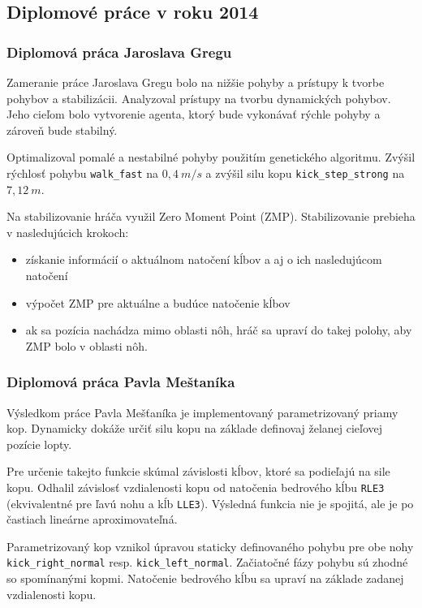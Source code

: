\subsection{Diplomové práce v roku 2014}

\subsubsection{Diplomová práca Jaroslava Gregu}
Zameranie práce Jaroslava Gregu \cite{grega} bolo na nižšie pohyby a prístupy k tvorbe pohybov a stabilizácii. Analyzoval prístupy na tvorbu dynamických pohybov. Jeho cieľom bolo vytvorenie agenta, ktorý bude vykonávať rýchle pohyby a zároveň bude stabilný. 

Optimalizoval pomalé a nestabilné pohyby použitím genetického algoritmu. Zvýšil rýchlosť pohybu \texttt{walk\_fast} na $0,4~m/s$ a zvýšil silu kopu \texttt{kick\_step\_strong} na $7,12~m$.

Na stabilizovanie hráča využil Zero Moment Point (ZMP). Stabilizovanie prebieha v nasledujúcich krokoch:
\begin{itemize}
	\item získanie informácií o aktuálnom natočení kĺbov a aj o ich nasledujúcom natočení
	\item výpočet ZMP pre aktuálne a budúce natočenie kĺbov
	\item ak sa pozícia nachádza mimo oblasti nôh, hráč sa upraví do takej polohy, aby ZMP bolo v oblasti nôh.
\end{itemize}

\subsubsection{Diplomová práca Pavla Meštaníka} \label{sec_mestanik}

Výsledkom práce Pavla Mešťaníka \cite{mestanik} je implementovaný parametrizovaný priamy kop. Dynamicky dokáže určiť silu kopu na základe definovaj želanej cieľovej pozície lopty. 

Pre určenie takejto funkcie skúmal závislosti kĺbov, ktoré sa podieľajú na sile kopu. Odhalil závislosť vzdialenosti kopu od natočenia bedrového kĺbu \texttt{RLE3} (ekvivalentné pre ľavú nohu a kĺb \texttt{LLE3}). Výsledná funkcia nie je spojitá, ale je po častiach lineárne aproximovateľná. 

Parametrizovaný kop vznikol úpravou staticky definovaného pohybu pre obe nohy \texttt{kick\_right\_normal} resp. \texttt{kick\_left\_normal}. Začiatočné fázy pohybu sú zhodné so spomínanými kopmi. Natočenie bedrového kĺbu sa upraví na základe zadanej vzdialenosti kopu.

